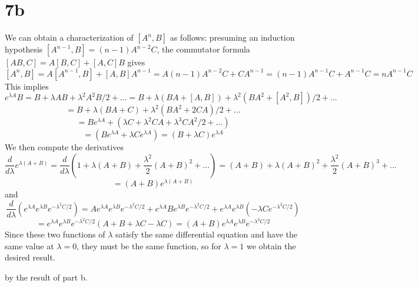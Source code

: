 \documentclass{article}
\begin{document}
\section*{7b}
We can obtain a characterization of $[A^{n},B]$ as follows:
presuming an induction hypothesis $[A^{n-1},B]=(n-1)A^{n-2}C$, the commutator formula $[AB,C]=A[B,C]+[A,C]B$ gives
\[
  [A^{n},B]=A[A^{n-1},B]+ [A,B]A^{n-1}
  =A(n-1)A^{n-2}C+CA^{n-1}
  =(n-1)A^{n-1}C+A^{n-1}C
  =nA^{n-1}C
\]
This implies
\[
  e^{\lambda A}B
  =B+\lambda AB+\lambda^{2} A^{2}B/2+...
  =B+\lambda\left( BA+[A,B] \right)+\lambda^{2}(BA^{2}+[A^{2},B])/2+...
\]
\[
  =B+\lambda\left( BA+C \right)+\lambda^{2}\left( BA^{2} +2CA\right)/2+...
\]
\[
  =Be^{\lambda A}+\left( \lambda C+ \lambda^{2}CA+\lambda^{3}CA^{2}/2+... \right)
\]
\[
  =(Be^{\lambda A}+\lambda C e^{\lambda A})=(B+\lambda C)e^{\lambda A}
\]
We then compute the derivatives
\[
  \frac{d}{d\lambda}e^{\lambda (A+B)}=\frac{d}{d\lambda}\left(  1+\lambda(A+B)+\frac{\lambda^{2}}{2}(A+B)^{2}+...\right)
  =(A+B)+\lambda (A+B)^{2}+\frac{\lambda^{2}}{2}(A+B)^{3}+...
\]
\[
  =(A+B)e^{\lambda(A+B)}
\]
and
\[
  \frac{d}{d\lambda}(e^{\lambda A}e^{\lambda B}e^{-\lambda^{2}C/2})
  =Ae^{\lambda A}e^{\lambda B}e^{-\lambda^{2}C/2}+e^{\lambda A}Be^{\lambda B}e^{-\lambda^{2}C/2}
  +e^{\lambda A}e^{\lambda B}\left( -\lambda Ce^{-\lambda^{2}C/2} \right)
\]
\[
  =e^{\lambda A}e^{\lambda B}e^{-\lambda^{2}C/2}\left( A+B+\lambda C-\lambda C \right)
  =(A+B)e^{\lambda A}e^{\lambda B}e^{-\lambda^{2}C/2}
\]
Since these two functions of $\lambda$ satisfy the same differential equation and have the same value at $\lambda=0$,
they must be the same function, so for $\lambda=1$ we obtain the desired result.

by the result of part b.
\end{document}
